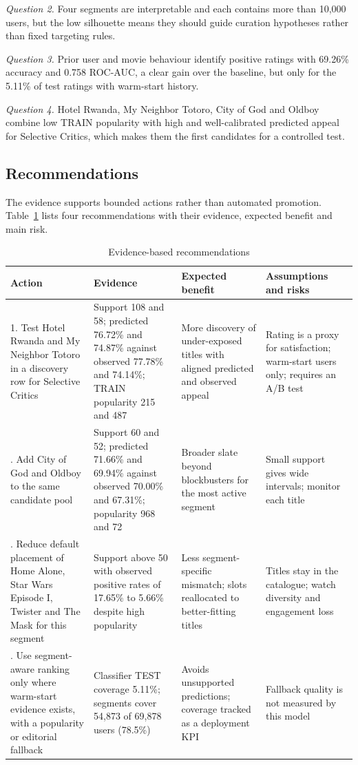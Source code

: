 \documentclass[conference]{IEEEtran}
\begin{document}
\textit{Question 2.} Four segments are interpretable and each contains more than 10,000 users, but the low silhouette means they should guide curation hypotheses rather than fixed targeting rules.

\textit{Question 3.} Prior user and movie behaviour identify positive ratings with 69.26\% accuracy and 0.758 ROC-AUC, a clear gain over the baseline, but only for the 5.11\% of test ratings with warm-start history.

\textit{Question 4.} Hotel Rwanda, My Neighbor Totoro, City of God and Oldboy combine low TRAIN popularity with high and well-calibrated predicted appeal for Selective Critics, which makes them the first candidates for a controlled test.

\subsection{Recommendations}
The evidence supports bounded actions rather than automated promotion. Table~\ref{tab:rec} lists four recommendations with their evidence, expected benefit and main risk.

\begin{table}[!t]
\caption{Evidence-based recommendations}
\label{tab:rec}
\centering
\begin{tabular}{@{}p{}p{}p{}p{}@{}}
\toprule
Action & Evidence & Expected benefit & Assumptions and risks \\
\midrule
1. Test Hotel Rwanda and My Neighbor Totoro in a discovery row for Selective Critics & Support 108 and 58; predicted 76.72\% and 74.87\% against observed 77.78\% and 74.14\%; TRAIN popularity 215 and 487 & More discovery of under-exposed titles with aligned predicted and observed appeal & Rating is a proxy for satisfaction; warm-start users only; requires an A/B test \\
\addlinespace
2. Add City of God and Oldboy to the same candidate pool & Support 60 and 52; predicted 71.66\% and 69.94\% against observed 70.00\% and 67.31\%; popularity 968 and 72 & Broader slate beyond blockbusters for the most active segment & Small support gives wide intervals; monitor each title \\
\addlinespace
3. Reduce default placement of Home Alone, Star Wars Episode I, Twister and The Mask for this segment & Support above 50 with observed positive rates of 17.65\% to 5.66\% despite high popularity & Less segment-specific mismatch; slots reallocated to better-fitting titles & Titles stay in the catalogue; watch diversity and engagement loss \\
\addlinespace
4. Use segment-aware ranking only where warm-start evidence exists, with a popularity or editorial fallback & Classifier TEST coverage 5.11\%; segments cover 54,873 of 69,878 users (78.5\%) & Avoids unsupported predictions; coverage tracked as a deployment KPI & Fallback quality is not measured by this model \\
\bottomrule
\end{tabular}
\end{table}
\end{document}
